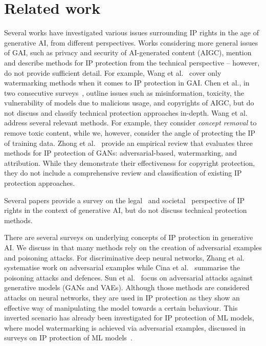 \documentclass[conference,table]{IEEEtran}
\begin{document}
\section{Related work}\label{sec:related-work}
Several works have investigated various issues surrounding IP rights in the age of generative AI, from different perspectives.
Works considering more general issues of GAI, such as privacy and security of AI-generated content (AIGC), mention and describe methods for IP protection from the technical perspective -- however, do not provide sufficient detail. For example, Wang et al.~\cite{wang_survey_2023} cover only watermarking methods when it comes to IP protection in GAI. Chen et al., in two consecutive surveys~\cite{chen_challenges_2023,chen_pathway_2023}, outline issues such as misinformation, toxicity, the vulnerability of models due to malicious usage, and copyrights of AIGC, but do not discuss and classify technical protection approaches in-depth.
Wang et al.~\cite{wang_security_2023} address several relevant methods. For example, they consider \textit{concept removal} to remove toxic content, while we, however, consider the angle of protecting the IP of training data.
Zhong et al.~\cite{zhong_copyright_2023} provide an empirical review that evaluates three methods for IP protection of GANs: adversarial-based, watermarking, and attribution. While they demonstrate their effectiveness for copyright protection, they do not include a comprehensive review and classification of existing IP protection approaches. 

Several papers provide a survey on the legal~\cite{smits_generative_2022,chesterman_good_2023} and societal~\cite{hristov_artificial_2019} perspective of IP rights in the context of generative AI, but do not discuss technical protection methods. 

There are several surveys on underlying concepts of IP protection in generative AI. We discuss in  that many methods rely on the creation of adversarial examples and poisoning attacks. 
For discriminative deep neural networks, Zhang et al.~\cite{zhang_adversarial_2019} systematise work on adversarial examples while Cina et al.~\cite{cina_wild_2023} summarise the poisoning attacks and defences.
Sun et al.~\cite{sun_adversarial_2023} focus on adversarial attacks against generative models (GANs and VAEs).
Although those methods are considered attacks on neural networks, they are used in IP protection as they show an effective way of manipulating the model towards a certain behaviour. 
This inverted scenario has already been investigated for IP protection of ML models, where model watermarking is achieved via adversarial examples, discussed in surveys on IP protection of ML models~\cite{lederer_identifying_2023,regazzoni_protecting_2021}.
\end{document}
